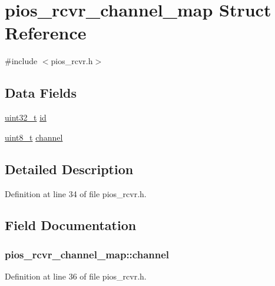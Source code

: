 \hypertarget{structpios__rcvr__channel__map}{\section{pios\-\_\-rcvr\-\_\-channel\-\_\-map Struct Reference}
\label{structpios__rcvr__channel__map}
}


{\ttfamily \#include $<$pios\-\_\-rcvr.\-h$>$}

\subsection*{Data Fields}
\begin{DoxyCompactItemize}
\item 
\hyperlink{stdint_8h_a435d1572bf3f880d55459d9805097f62}{uint32\-\_\-t} \hyperlink{structpios__rcvr__channel__map_afab196794b5bf1f8bfdc1b65a97988e4}{id}
\item 
\hyperlink{stdint_8h_aba7bc1797add20fe3efdf37ced1182c5}{uint8\-\_\-t} \hyperlink{structpios__rcvr__channel__map_ae3298456cc561194968e0259c4c14add}{channel}
\end{DoxyCompactItemize}


\subsection{Detailed Description}


Definition at line 34 of file pios\-\_\-rcvr.\-h.



\subsection{Field Documentation}
\hypertarget{structpios__rcvr__channel__map_ae3298456cc561194968e0259c4c14add}{
\subsubsection[{channel}]{ pios\-\_\-rcvr\-\_\-channel\-\_\-map\-::channel}}\label{structpios__rcvr__channel__map_ae3298456cc561194968e0259c4c14add}


Definition at line 36 of file pios\-\_\-rcvr.\-h.

